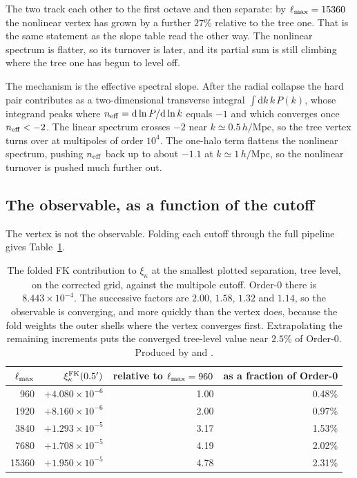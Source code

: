 \noindent
The two track each other to the first octave and then separate: by
$\ell_{\max}=15360$ the nonlinear vertex has grown by a further $27\%$ relative
to the tree one. That is the same statement as the slope table read the
other way. The nonlinear spectrum is flatter, so its turnover is later, and
its partial sum is still climbing where the tree one has begun to level
off.

The mechanism is the effective spectral slope. After the radial collapse
the hard pair contributes as a two-dimensional transverse integral
$\int\!\mathrm{d}k\,k\,P(k)$, whose integrand peaks where
$n_{\rm eff}=\mathrm{d}\ln P/\mathrm{d}\ln k$ equals $-1$ and which
converges once $n_{\rm eff}<-2$. The linear spectrum crosses $-2$ near
$k\simeq0.5\,h/$Mpc, so the tree vertex turns over at multipoles of order
$10^4$. The one-halo term flattens the nonlinear spectrum, pushing
$n_{\rm eff}$ back up to about $-1.1$ at $k\simeq1\,h/$Mpc, so the
nonlinear turnover is pushed much further out.

\subsection{The observable, as a function of the cutoff}

The vertex is not the observable. Folding each cutoff through the full
pipeline gives Table~\ref{tab:foldcut}.

\begin{table}[h]
\centering
\begin{tabular}{rrrr}
\toprule
$\ell_{\max}$ & $\xi^{\rm FK}_\kappa(0.5')$ & relative to $\ell_{\max}=960$ & as a fraction of Order-0 \\
\midrule
   960 & $+4.080\times10^{-6}$ & 1.00 & 0.48\% \\
  1920 & $+8.160\times10^{-6}$ & 2.00 & 0.97\% \\
  3840 & $+1.293\times10^{-5}$ & 3.17 & 1.53\% \\
  7680 & $+1.708\times10^{-5}$ & 4.19 & 2.02\% \\
 15360 & $+1.950\times10^{-5}$ & 4.78 & 2.31\% \\
\bottomrule
\end{tabular}
\caption{The folded FK contribution to $\xi_\kappa$ at the smallest plotted
separation, tree level, on the corrected grid, against the multipole
cutoff. Order-0 there is $8.443\times10^{-4}$. The successive factors are
$2.00$, $1.58$, $1.32$ and $1.14$, so the observable is converging, and
more quickly than the vertex does, because the fold weights the outer
shells where the vertex converges first. Extrapolating the remaining
increments puts the converged tree-level value near $2.5\%$ of Order-0. Produced by 
and .}
\label{tab:foldcut}
\end{table}

